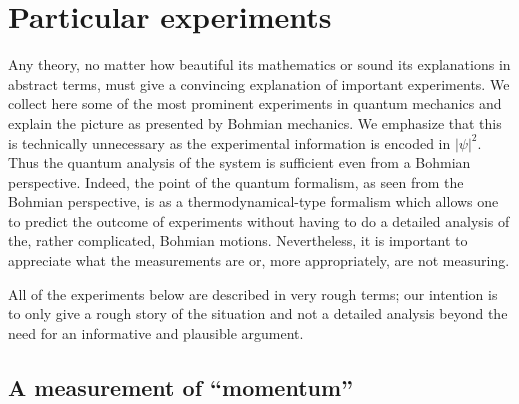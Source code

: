 \documentclass[11pt]{article}
\theoremstyle{remark}
\begin{document}
\section{Particular experiments}


Any theory, no matter how beautiful its mathematics or sound its
explanations in abstract terms, must give a convincing explanation of
important experiments. We collect here some of the most prominent
experiments in quantum mechanics and explain the picture as presented
by Bohmian mechanics. We emphasize that this is technically unnecessary
as the experimental information is encoded in \ensuremath{|\ensuremath{\psi}|^2}. Thus the
quantum analysis of the system is sufficient even from a Bohmian
perspective. Indeed, the point of the
quantum formalism, as seen from the Bohmian perspective, is as a
thermodynamical-type formalism which allows one to predict the outcome of
experiments without having to do a detailed analysis of the, rather
complicated, Bohmian motions. Nevertheless, it is important to
appreciate what the measurements are or, more appropriately, are not 
measuring. 

All of the experiments below
are described in very rough terms; our intention is to only give a
rough story of the situation and not a detailed analysis beyond the
need for an informative and plausible argument. 

\subsection{A measurement of ``momentum''}
\end{document}
